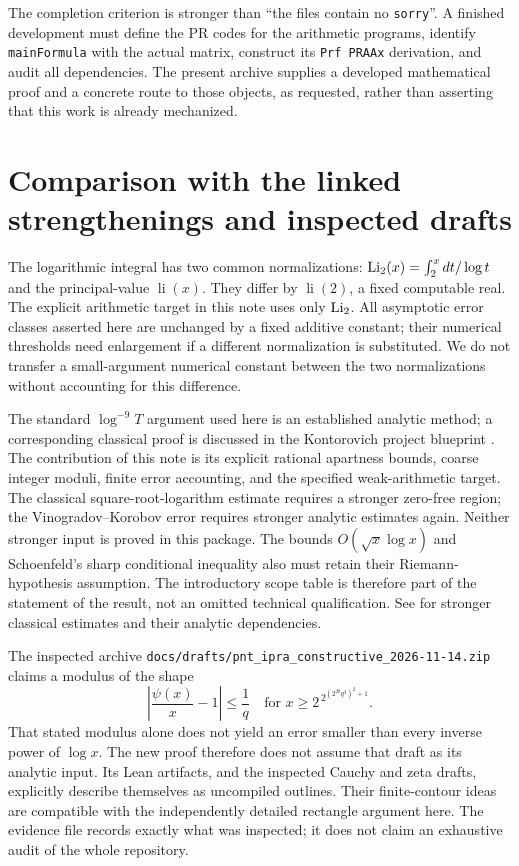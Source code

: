 The completion criterion is stronger than ``the files contain no
\texttt{sorry}''. A finished development must define the PR codes for
the arithmetic programs, identify \texttt{mainFormula} with the actual
matrix, construct its \texttt{Prf PRAAx} derivation, and audit all
dependencies. The present archive supplies a developed mathematical proof
and a concrete route to those objects, as requested, rather than asserting
that this work is already mechanized.

\section{Comparison with the linked strengthenings and inspected drafts}
\label{sec:scope}

The logarithmic integral has two common normalizations:
$\operatorname{Li}_2(x)=\int_2^xdt/\log t$ and the principal-value $\operatorname{li}(x)$.
They differ by $\operatorname{li}(2)$, a fixed computable real. The explicit
arithmetic target in this note uses only $\operatorname{Li}_2$. All asymptotic error
classes asserted here are unchanged by a fixed additive constant;
their numerical thresholds need enlargement if a different normalization
is substituted. We do not transfer a small-argument numerical constant
between the two normalizations without accounting for this difference.

The standard $\log^{-9}T$ argument used here is an established analytic
method; a corresponding classical proof is discussed in the
Kontorovich project blueprint \cite{Kontorovich}. The contribution of this
note is its explicit rational apartness bounds, coarse integer moduli,
finite error accounting, and the specified weak-arithmetic target. The
classical square-root-logarithm estimate requires a stronger zero-free
region; the Vinogradov--Korobov error requires stronger analytic estimates
again. Neither stronger input is proved in this package. The bounds
$O(\sqrt x\log x)$ and Schoenfeld's sharp conditional inequality also
must retain their Riemann-hypothesis assumption. The introductory scope
table is therefore part of the statement of the result, not an omitted
technical qualification. See \cite{Tao,Trudgian} for stronger classical
estimates and their analytic dependencies.

The inspected archive
\texttt{docs/drafts/pnt\_ipra\_constructive\_2026-11-14.zip}
claims a modulus of the shape
\[
 \left|\frac{\psi(x)}x-1\right|\le\frac1q
 \quad\text{for }x\ge2^{\,2^{(2^{20}q^3)^2+1}}.
\]
That stated modulus alone does not yield an error smaller than every
inverse power of $\log x$. The new proof therefore does not assume that
draft as its analytic input. Its Lean artifacts, and the inspected Cauchy
and zeta drafts, explicitly describe themselves as uncompiled outlines.
Their finite-contour ideas are compatible with the independently detailed
rectangle argument here. The evidence file records exactly what was
inspected; it does not claim an exhaustive audit of the whole repository.

